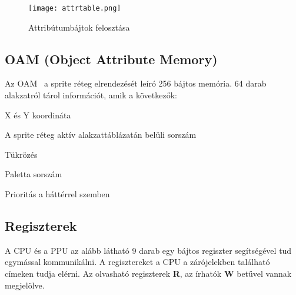 \begin{figure}[H]
	\centering
	\texttt{[image: attrtable.png]}
	\caption{Attribútumbájtok felosztása}
	\label{fig:attr}
\end{figure}

\subsection{OAM (Object Attribute Memory)}

Az OAM~\cite{ppuref} a sprite réteg elrendezését leíró 256 bájtos memória. 64 darab alakzatról tárol információt, amik a következők:

\begin{compactitem}
	\item X és Y koordináta
	\item A sprite réteg aktív alakzattáblázatán belüli sorszám
	\item Tükrözés
	\item Paletta sorszám
	\item Prioritás a háttérrel szemben
\end{compactitem}

\subsection{Regiszterek}

A CPU és a PPU az alább látható 9 darab egy bájtos regiszter segítségével tud egymással kommunikálni. \cite{ppuref} A regisztereket a CPU a zárójelekben található címeken tudja elérni.
Az olvasható regiszterek \textbf{R}, az írhatók \textbf{W} betűvel vannak megjelölve.

\vspace{0.25cm}

